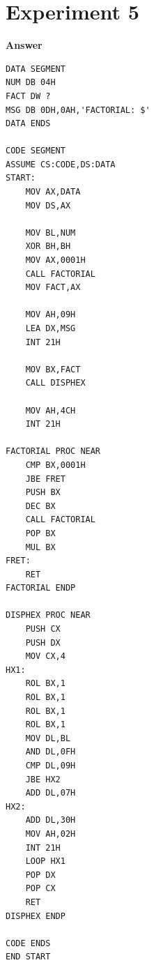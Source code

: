\documentclass[11pt,a4paper]{article}
\begin{document}
\section*{Experiment 5}
\noindent{}
\vspace{0.4em}
\noindent\textbf{Answer}
\begin{lstlisting}[style=asmbase]
DATA SEGMENT
NUM DB 04H
FACT DW ?
MSG DB 0DH,0AH,'FACTORIAL: $'
DATA ENDS

CODE SEGMENT
ASSUME CS:CODE,DS:DATA
START:
    MOV AX,DATA
    MOV DS,AX

    MOV BL,NUM
    XOR BH,BH
    MOV AX,0001H
    CALL FACTORIAL
    MOV FACT,AX

    MOV AH,09H
    LEA DX,MSG
    INT 21H

    MOV BX,FACT
    CALL DISPHEX

    MOV AH,4CH
    INT 21H

FACTORIAL PROC NEAR
    CMP BX,0001H
    JBE FRET
    PUSH BX
    DEC BX
    CALL FACTORIAL
    POP BX
    MUL BX
FRET:
    RET
FACTORIAL ENDP

DISPHEX PROC NEAR
    PUSH CX
    PUSH DX
    MOV CX,4
HX1:
    ROL BX,1
    ROL BX,1
    ROL BX,1
    ROL BX,1
    MOV DL,BL
    AND DL,0FH
    CMP DL,09H
    JBE HX2
    ADD DL,07H
HX2:
    ADD DL,30H
    MOV AH,02H
    INT 21H
    LOOP HX1
    POP DX
    POP CX
    RET
DISPHEX ENDP

CODE ENDS
END START
\end{lstlisting}
\end{document}
